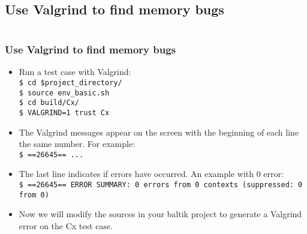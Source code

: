 \documentclass[10pt, hyperref={unicode=true,pdfusetitle, bookmarks=true,bookmarksnumbered=false,bookmarksopen=false, breaklinks=false,pdfborder={0 0 1},backref=true,colorlinks=true,linkcolor=darkblue,pageanchor, urlcolor=darkblue}]{beamer}
\begin{document}

\subsection{{\bf{Use Valgrind to find memory bugs}}}
\begin{frame}
\begin{columns}[c] 
\tableofcontents[sections={1-3},currentsection, currentsubsection]
\tableofcontents[sections={4-8},currentsection, currentsubsection]
\end{columns}
\end{frame}
\begin{frame}
\frametitle{Use Valgrind to find memory bugs}
\begin{itemize}
\item Run a test case with Valgrind:\\
\texttt{\$ cd \$project\_directory/}\\
\texttt{\$ source env\_basic.sh}\\
\texttt{\$ cd build/Cx/}\\
\texttt{\$ VALGRIND=1 trust Cx}\\
\item The Valgrind messages appear on the screen with the beginning of each line the same number. For example:\\
\texttt{\$ ==26645== ...}\\
\item The last line indicates if errors have occurred. An example with 0 error:\\
\texttt{\$ ==26645== ERROR SUMMARY: 0 errors from 0 contexts (suppressed: 0 from 0)}
\end{itemize}
\begin{itemize}
\item Now we will modify the sources in your baltik project to generate a Valgrind error on the Cx test case.\\
\end{itemize}
\end{frame}
\end{document}

